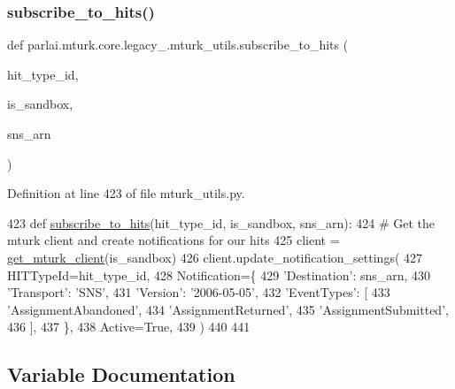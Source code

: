\subsubsection{\texorpdfstring{subscribe\+\_\+to\+\_\+hits()}{subscribe\_to\_hits()}}
{\footnotesize\ttfamily def parlai.\+mturk.\+core.\+legacy\+\_.\+mturk\+\_\+utils.\+subscribe\+\_\+to\+\_\+hits (\begin{DoxyParamCaption}\item[{}]{hit\+\_\+type\+\_\+id,  }\item[{}]{is\+\_\+sandbox,  }\item[{}]{sns\+\_\+arn }\end{DoxyParamCaption})}



Definition at line 423 of file mturk\+\_\+utils.\+py.


\begin{DoxyCode}
423 \textcolor{keyword}{def }\hyperlink{namespaceparlai_1_1mturk_1_1core_1_1mturk__utils_accc5838e30ccf9ab95050ab11ac0d973}{subscribe\_to\_hits}(hit\_type\_id, is\_sandbox, sns\_arn):
424     \textcolor{comment}{# Get the mturk client and create notifications for our hits}
425     client = \hyperlink{namespaceparlai_1_1mturk_1_1core_1_1mturk__utils_a577e2527c04682284394b0951a090695}{get\_mturk\_client}(is\_sandbox)
426     client.update\_notification\_settings(
427         HITTypeId=hit\_type\_id,
428         Notification=\{
429             \textcolor{stringliteral}{'Destination'}: sns\_arn,
430             \textcolor{stringliteral}{'Transport'}: \textcolor{stringliteral}{'SNS'},
431             \textcolor{stringliteral}{'Version'}: \textcolor{stringliteral}{'2006-05-05'},
432             \textcolor{stringliteral}{'EventTypes'}: [
433                 \textcolor{stringliteral}{'AssignmentAbandoned'},
434                 \textcolor{stringliteral}{'AssignmentReturned'},
435                 \textcolor{stringliteral}{'AssignmentSubmitted'},
436             ],
437         \},
438         Active=\textcolor{keyword}{True},
439     )
440 
441 
\end{DoxyCode}


\subsection{Variable Documentation}
\mbox{\label{namespaceparlai_1_1mturk_1_1core_1_1legacy__2018_1_1mturk__utils_ad7c6bfcd8f9679dbed0eebe64230458e}} 
